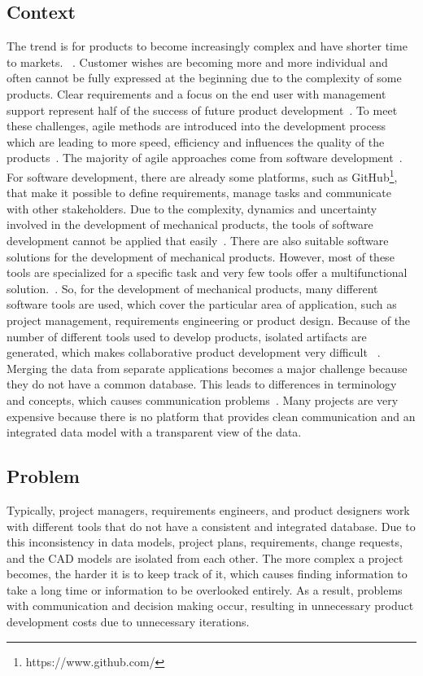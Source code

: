     \subsection*{Context}
    The trend is for products to become increasingly complex and have shorter time to markets. ~\cite{Ahti2005}.
    Customer wishes are becoming more and more individual and often cannot be fully expressed at the beginning due to the complexity of some products.
    Clear requirements and a focus on the end user with management support represent half of the success of future product development~\cite{6226784}.
    To meet these challenges, agile methods are introduced into the development process which are leading to more speed, efficiency and influences the quality of the products~\cite{ozkan2019agile}. 
    The majority of agile approaches come from software development~\cite{HEIMICKE2021786}.
    For software development, there are already some platforms, such as GitHub\footnote{https://www.github.com/}, that make it possible to define requirements, manage tasks and communicate with other stakeholders.
    Due to the complexity, dynamics and uncertainty involved in the development of mechanical products, the tools of software development cannot be applied that easily~\cite{HEIMICKE2021786}.
    There are also suitable software solutions for the development of mechanical products. However, most of these tools are specialized for a specific task and very few tools offer a multifunctional solution.~\cite{MarionTucker}. 
    So, for the development of mechanical products, many different software tools are used, which cover the particular area of application, such as project management, requirements engineering or product design.
    Because of the number of different tools used to develop products, isolated artifacts are generated, which makes collaborative product development very difficult ~\cite{houshmand2010collaborative}.
    Merging the data from separate applications becomes a major challenge because they do not have a common database. This leads to differences in terminology and concepts, which causes communication problems~\cite{Jorma2014}.
    Many projects are very expensive because there is no platform that provides clean communication and an integrated data model with a transparent view of the data. 
    
    \subsection*{Problem}
    Typically, project managers, requirements engineers, and product designers work with different tools that do not have a consistent and integrated database.
    Due to this inconsistency in data models, project plans, requirements, change requests, and the CAD models are isolated from each other.
    The more complex a project becomes, the harder it is to keep track of it, which causes finding information to take a long time or information to be overlooked entirely.  
    As a result, problems with communication and decision making occur, resulting in unnecessary product development costs due to unnecessary iterations.

